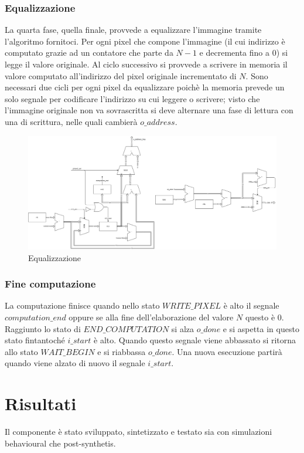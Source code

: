 \documentclass[11pt]{article} %
\begin{document}
\subsubsection{Equalizzazione}
La quarta fase, quella finale, provvede a equalizzare l'immagine tramite l'algoritmo fornitoci. Per ogni pixel che compone l'immagine (il cui indirizzo è computato grazie ad un contatore che parte da $N-1$ e decrementa fino a 0) si legge il valore originale. Al ciclo successivo si provvede a scrivere in memoria il valore computato all'indirizzo del pixel originale incrementato di $N$. Sono necessari due cicli per ogni pixel da equalizzare poichè la memoria prevede un solo segnale per codificare l'indirizzo su cui leggere o scrivere; visto che l'immagine originale non va sovrascritta si deve alternare una fase di lettura con una di scrittura, nelle quali cambierà $o\_address$.

\begin{figure}[h]
\centering
\includegraphics[width=120mm]{datapaths/computation.png}
\caption{Equalizzazione}
\end{figure}

\subsubsection{Fine computazione}
La computazione finisce quando nello stato $WRITE\_PIXEL$ è alto il segnale $computation\_end$ oppure se alla fine dell'elaborazione del valore $N$ questo è $0$. Raggiunto lo stato di $END\_COMPUTATION$ si alza $o\_done$ e si aspetta in questo stato fintantoché $i\_start$ è alto. Quando questo segnale viene abbassato si ritorna allo stato $WAIT\_BEGIN$ e si riabbassa $o\_done$. Una nuova esecuzione partirà quando viene alzato di nuovo il segnale $i\_start$.


\section{Risultati}
Il componente è stato sviluppato, sintetizzato e testato sia con simulazioni behavioural che post-synthetis.
\end{document}
